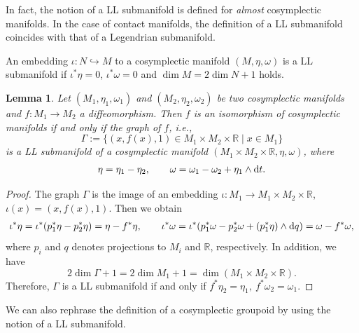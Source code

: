 \documentclass[pdftex]{sigma}
\numberwithin{equation}{section}
\newtheorem{Lemma}[Theorem]{Lemma}
\begin{document}
In fact, the notion of a LL submanifold is defined for \textit{almost} cosymplectic manifolds. In the case of contact manifolds, the definition of a LL submanifold coincides with that of a Legendrian submanifold.

\begin{Remark}
 An embedding $\iota\colon N\hookrightarrow M$ to a cosymplectic manifold $(M,\eta,\omega)$ is a LL sub\-mani\-fold if $\iota^\ast\eta=0$, $\iota^\ast\omega=0$ and $\dim M=2\dim N+1$ holds.
\end{Remark}

\begin{Lemma}
 Let $(M_1,\eta_1,\omega_1)$ and $(M_2,\eta_2,\omega_2)$ be two cosymplectic manifolds and $f\colon M_1\to M_2$ a diffeomorphism. Then $f$ is an isomorphism of cosymplectic manifolds if and only if the graph of $f$, i.e.,
 \[\Gamma:=\{(x,f(x),1)\in M_1\times M_2\times\mathbb{R}\mid x\in M_1\}\]
 is a LL submanifold of a cosymplectic manifold $(M_1\times M_2\times\mathbb{R},\eta,\omega)$, where
 \[\eta=\eta_1-\eta_2,\qquad\omega=\omega_1-\omega_2+\eta_1\wedge {\rm d}t.\]
\end{Lemma}
\begin{proof}
 The graph $\Gamma$ is the image of an embedding
 $\iota\colon M_1\to M_1\times M_2\times\mathbb{R}$, $\iota(x)=(x,f(x),1)$. Then we obtain
 \begin{gather*}
 \iota^\ast{\eta}=\iota^\ast(p_1^\ast\eta-p_2^\ast\eta)=\eta-f^\ast\eta,\qquad
 \iota^\ast{\omega}=\iota^\ast(p_1^\ast\omega-p_2^\ast\omega+(p_1^\ast\eta)\wedge {\rm d}q)=\omega-f^\ast\omega,
 \end{gather*}
 where $p_i$ and $q$ denotes projections to $M_i$ and $\mathbb{R}$, respectively. In addition, we have
 \[2\dim\Gamma+1=2\dim M_1+1=\dim(M_1\times M_2\times\mathbb{R}).\]
 Therefore, $\Gamma$ is a LL submanifold if and only if $f^\ast\eta_2=\eta_1,\ f^\ast\omega_2=\omega_1$.
\end{proof}

We can also rephrase the definition of a cosymplectic groupoid by using the notion of a LL submanifold.
\end{document}
